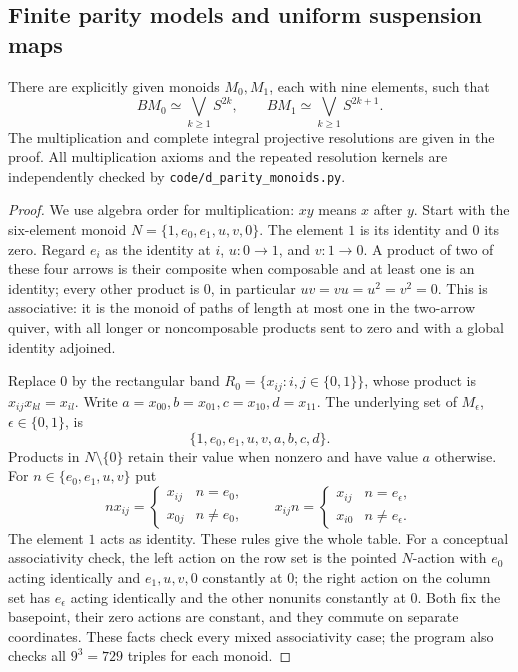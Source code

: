 \subsection{Finite parity models and uniform suspension maps}

\begin{theorem}
\label{D:parity-monoids}
There are explicitly given monoids $M_0,M_1$, each with nine elements,
such that
\[
 BM_0\simeq\bigvee_{k\geq1}S^{2k},\qquad
 BM_1\simeq\bigvee_{k\geq1}S^{2k+1}.
\]
The multiplication and complete integral projective resolutions are
given in the proof.  All multiplication axioms and the repeated
resolution kernels are independently checked by
\texttt{code/d\_parity\_monoids.py}.
\end{theorem}
\begin{proof}
We use algebra order for multiplication: $xy$ means $x$ after $y$.
Start with the six-element monoid
$N=\{1,e_0,e_1,u,v,0\}$.  The element $1$ is its identity and
$0$ its zero.  Regard $e_i$ as the identity at $i$, $u:0\to1$,
and $v:1\to0$.  A product of two of these four arrows is their
composite when composable and at least one is an identity; every
other product is $0$, in particular $uv=vu=u^2=v^2=0$.
This is associative: it is the monoid of paths of length at most
one in the two-arrow quiver, with all longer or noncomposable
products sent to zero and with a global identity adjoined.

Replace $0$ by the rectangular band
$R_0=\{x_{ij}:i,j\in\{0,1\}\}$, whose product is
$x_{ij}x_{kl}=x_{il}$.  Write
$a=x_{00}, b=x_{01}, c=x_{10}, d=x_{11}$.
The underlying set of $M_\epsilon$, $\epsilon\in\{0,1\}$, is
\[
 \{1,e_0,e_1,u,v,a,b,c,d\}.
\]
Products in $N\setminus\{0\}$ retain their value when nonzero
and have value $a$ otherwise.  For
$n\in\{e_0,e_1,u,v\}$ put
\[
 n x_{ij}=
 \begin{cases}x_{ij}&n=e_0,\\x_{0j}&n\ne e_0,\end{cases}
 \qquad
 x_{ij}n=
 \begin{cases}x_{ij}&n=e_\epsilon,\\x_{i0}&n\ne e_\epsilon.
 \end{cases}
\]
The element $1$ acts as identity.  These rules give the whole table.
For a conceptual associativity check, the left action on the row
set is the pointed $N$-action with $e_0$ acting identically and
$e_1,u,v,0$ constantly at $0$; the right action on the column
set has $e_\epsilon$ acting identically and the other nonunits
constantly at $0$.  Both fix the basepoint, their zero actions
are constant, and they commute on separate coordinates.
These facts check every mixed associativity case; the program also
checks all $9^3=729$ triples for each monoid.


\end{proof}
